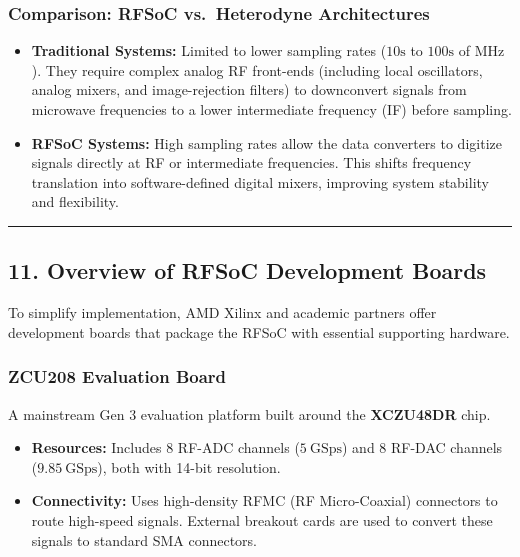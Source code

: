 \documentclass[
]{article}
\providecommand{\tightlist}{%
  \setlength{\itemsep}{0pt}\setlength{\parskip}{0pt}}
\begin{document}
\subsubsection{Comparison: RFSoC vs.~Heterodyne
Architectures}\label{comparison-rfsoc-vs.-heterodyne-architectures}

\begin{itemize}
\tightlist
\item
  \textbf{Traditional Systems:} Limited to lower sampling rates
  (\(10\text{s}\) to \(100\text{s}\) of \(\text{MHz}\)). They require
  complex analog RF front-ends (including local oscillators, analog
  mixers, and image-rejection filters) to downconvert signals from
  microwave frequencies to a lower intermediate frequency (IF) before
  sampling.
\item
  \textbf{RFSoC Systems:} High sampling rates allow the data converters
  to digitize signals directly at RF or intermediate frequencies. This
  shifts frequency translation into software-defined digital mixers,
  improving system stability and flexibility.
\end{itemize}

\begin{center}\rule{0.5\linewidth}{0.5pt}\end{center}

\subsection{11. Overview of RFSoC Development
Boards}\label{overview-of-rfsoc-development-boards}

To simplify implementation, AMD Xilinx and academic partners offer
development boards that package the RFSoC with essential supporting
hardware.

\subsubsection{ZCU208 Evaluation Board}\label{zcu208-evaluation-board}

A mainstream Gen 3 evaluation platform built around the
\textbf{XCZU48DR} chip.

\begin{itemize}
\tightlist
\item
  \textbf{Resources:} Includes 8 RF-ADC channels (\(5\ \text{GSps}\))
  and 8 RF-DAC channels (\(9.85\ \text{GSps}\)), both with 14-bit
  resolution.
\item
  \textbf{Connectivity:} Uses high-density RFMC (RF Micro-Coaxial)
  connectors to route high-speed signals. External breakout cards are
  used to convert these signals to standard SMA connectors.
\end{itemize}
\end{document}
